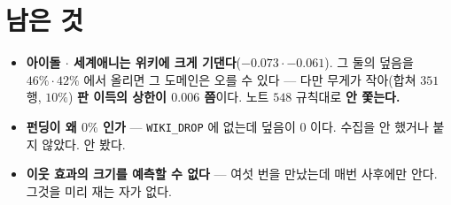 \documentclass[11pt]{article}
\begin{document}
\section*{남은 것}

\begin{itemize}
\item \textbf{아이돌 $\cdot$ 세계애니는 위키에 크게 기댄다}($-0.073 \cdot
-0.061$). 그 둘의 덮음을 $46\% \cdot 42\%$ 에서 올리면 그 도메인은 오를
수 있다 --- 다만 무게가 작아(합쳐 $351$ 행, $10\%$) \textbf{판 이득의
상한이 $0.006$ 쯤}이다. 노트 $548$ 규칙대로 \textbf{안 쫓는다.}
\item \textbf{펀딩이 왜 $0\%$ 인가} --- \texttt{WIKI\_DROP} 에 없는데 덮음이
$0$ 이다. 수집을 안 했거나 붙지 않았다. 안 봤다.
\item \textbf{이웃 효과의 크기를 예측할 수 없다} --- 여섯 번을 만났는데
매번 사후에만 안다. 그것을 미리 재는 자가 없다.
\end{itemize}
\end{document}
